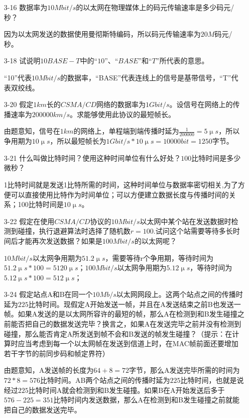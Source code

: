 \documentclass[a4paper,UTF8]{article}
\begin{document}
\begin{enumerate}
\item[3-16] 数据率为$10Mbit/s$的以太网在物理媒体上的码元传输速率是多少码元/秒？
\begin{solution}
    因为以太网发送的数据使用曼彻斯特编码，所以码元传输速率为$20M$码元/秒。
\end{solution}

\item[3-18] 试说明$10BASE-T$中的“$10$”、“$BASE$”和“$T$”所代表的意思。
\begin{solution}
    “10”代表$10Mbit/s$的数据率，“BASE”代表连线上的信号是基带信号，“T”代表双绞线。
\end{solution}

\item[3-20] 假定$1km$长的$CSMA/CD$网络的数据率为$1Gbit/s$。设信号在网络上的传播速率为$200000km/s$。求能够使用此协议的最短帧长。
\begin{solution}
    由题意知，信号在$1km$的网络上，单程端到端传播时延为$\frac{1}{200000}=5\upmu s$，所以争用期为$10\upmu s$，所以最短帧长为$1Gbit/s * 10\upmu s = 10000bit = 1250$字节。
\end{solution}

\item[3-21] 什么叫做比特时间？使用这种时间单位有什么好处？$100$比特时间是多少微秒？
\begin{solution}
    1比特时间就是发送1比特所需的时间，这种时间单位与数据率密切相关,为了方便可以直接使用比特作为时间单位；可以方便建立数据长度与传播时间的关系；100比特时间是$10\upmu s$。
\end{solution}

\item[3-22] 假定在使用$CSMA/CD$协议的$10Mbit/s$以太网中某个站在发送数据时检测到碰撞，执行退避算法时选择了随机数$r = 100$.试问这个站需要等待多长时间后才能再次发送数据？如果是$100Mbit/s$的以太网呢？
\begin{solution}
    $10Mbit/s$以太网争用期为$51.2\upmu s$，需要等待r个争用期，等待时间为$51.2\upmu s * 100 = 5120\upmu s$；$100Mbit/s$以太网争用期为$5.12\upmu s$，等待时间为$5.12\upmu s * 100 = 512\upmu s$；
\end{solution}

\item[3-24] 假定站点A和B在同一个$10Mb/s$以太网网段上。这两个站点之间的传播时延为$225$比特时间。现假定A开始发送一帧，并且在A发送结束之前B也发送一帧。如果A发送的是以太网所容许的最短的帧，那么A在检测到和B发生碰撞之前能否把自己的数据发送完毕？换言之，如果A在发送完毕之前并没有检测到碰撞，那么能否肯定A所发送到帧不会和B发送的帧发生碰撞？（提示：在计算时应当考虑到每一个以太网帧在发送到信道上时，在MAC帧前面还要增加若干字节的前同步码和帧定界符） 
\begin{solution}
    由题意知，A发送帧的长度为$64 + 8 = 72$字节，那么A发送完毕所需的时间为$72 * 8 = 576$比特时间。AB两个站点之间的传播时延为$225$比特时间，也就是说经过$225$比特时间A就会检测到和B发生碰撞。如果B在A开始发送后多于$576 - 225 = 351$比特时间内发送数据，那么A在检测到和B发生碰撞之前就能把自己的数据发送完毕。
\end{solution}


\end{enumerate}
\end{document}
